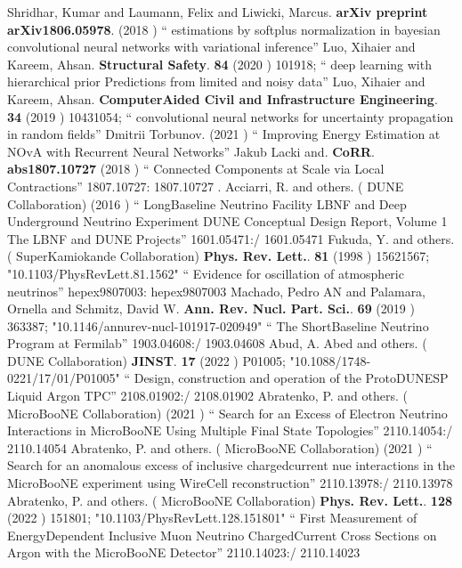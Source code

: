 \documentclass{article}
\begin{document}
\begin{thebibliography}{99}
 Shridhar, Kumar and Laumann, Felix and Liwicki, Marcus. {\bf arXiv preprint arXiv1806.05978}. (2018 ) `` estimations by softplus normalization in bayesian convolutional neural networks with variational inference''
 Luo, Xihaier and Kareem, Ahsan. {\bf Structural Safety}. {\bf 84} (2020 ) 101918; `` deep learning with hierarchical prior Predictions from limited and noisy data''
 Luo, Xihaier and Kareem, Ahsan. {\bf ComputerAided Civil and Infrastructure Engineering}. {\bf 34} (2019 ) 10431054; `` convolutional neural networks for uncertainty propagation in random fields''
  Dmitrii Torbunov. (2021 ) `` Improving Energy Estimation at NOvA with Recurrent Neural Networks''
  Jakub Lacki and. {\bf  CoRR}. {\bf  abs1807.10727} (2018 ) `` Connected Components at Scale via Local Contractions'' 1807.10727: 1807.10727
 . 
  Acciarri, R. and others. ( DUNE Collaboration) (2016 ) `` LongBaseline Neutrino Facility LBNF and Deep Underground Neutrino Experiment DUNE Conceptual Design Report, Volume 1 The LBNF and DUNE Projects'' 1601.05471:/ 1601.05471
  Fukuda, Y. and others. ( SuperKamiokande Collaboration) {\bf  Phys. Rev. Lett.}. {\bf  81} (1998 )  15621567;  "10.1103/PhysRevLett.81.1562" `` Evidence for oscillation of atmospheric neutrinos'' hepex9807003: hepex9807003
  Machado, Pedro AN and Palamara, Ornella and Schmitz, David W. {\bf  Ann. Rev. Nucl. Part. Sci.}. {\bf  69} (2019 )  363387;  "10.1146/annurev-nucl-101917-020949" `` The ShortBaseline Neutrino Program at Fermilab'' 1903.04608:/ 1903.04608
  Abud, A. Abed and others. ( DUNE Collaboration) {\bf  JINST}. {\bf  17} (2022 )  P01005;  "10.1088/1748-0221/17/01/P01005" `` Design, construction and operation of the ProtoDUNESP Liquid Argon TPC'' 2108.01902:/ 2108.01902
  Abratenko, P. and others. ( MicroBooNE Collaboration) (2021 ) `` Search for an Excess of Electron Neutrino Interactions in MicroBooNE Using Multiple Final State Topologies'' 2110.14054:/ 2110.14054
  Abratenko, P. and others. ( MicroBooNE Collaboration) (2021 ) `` Search for an anomalous excess of inclusive chargedcurrent nue interactions in the MicroBooNE experiment using WireCell reconstruction'' 2110.13978:/ 2110.13978
  Abratenko, P. and others. ( MicroBooNE Collaboration) {\bf  Phys. Rev. Lett.}. {\bf  128} (2022 )  151801;  "10.1103/PhysRevLett.128.151801" `` First Measurement of EnergyDependent Inclusive Muon Neutrino ChargedCurrent Cross Sections on Argon with the MicroBooNE Detector'' 2110.14023:/ 2110.14023

\end{thebibliography}
\end{document}
